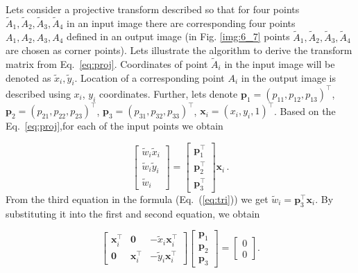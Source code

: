 \documentclass[12pt]{article}
\def\mvec#1{\mathbf{#1}}
\begin{document}
Lets consider a projective transform described so that for four points $\tilde{A}_{1} ,\tilde{A}_{2} ,\tilde{A}_{3} ,\tilde{A}_{4}$
in an input image there are corresponding four points $A_{1} ,A_{2}, A_{3}, A_{4}$ defined in an output image
(in Fig. \ref{img:6_7} points $\tilde{A}_{1}, \tilde{A}_{2}, \tilde{A}_{3}, \tilde{A}_{4}$ are chosen as corner points).
Lets illustrate the algorithm to derive the transform matrix from Eq.~\eqref{eq:proj}.
Coordinates of point $\tilde{A}_{i}$ in the input image will be denoted as $\tilde{x}_{i}, \tilde{y}_{i}$.
Location of a corresponding point $A_i$ in the output image is described using $x_i$, $y_i$ coordinates.
Further, lets denote $\mathbf{p}_1 = (p_{11}, p_{12}, p_{13})^\top$, $\mathbf{p}_2 = (p_{21}, p_{22}, p_{23})^\top$, $\mathbf{p}_3 = (p_{31}, p_{32}, p_{33})^\top$, $\mathbf{x}_i = (x_i, y_i, 1)^\top$.
Based on the Eq.~\eqref{eq:proj},for each of the input points we obtain

\begin{equation}
    \label{eq:tri}
\left[\begin{array}{c} {\tilde{w}_{i} \tilde{x}_{i} } \\ {\tilde{w}_{i} \tilde{y}_{i} } \\ {\tilde{w}_{i} } \end{array}\right]=\left[\begin{array}{c} {\mvec{p}_{1}^\top} \\ {\mvec{p}_{2}^\top} \\ {\mvec{p}_{3}^\top} \end{array}\right]\mvec{x}_{i} \, .
\end{equation}
From the third equation in the formula (Eq.~(\ref{eq:tri})) we get $\tilde{w}_{i} = \mathbf{p}_3^\top \mathbf{x}_{i}$.
By substituting it into the first and second equation, we obtain

\begin{equation}
    \label{eq:our_proj}
    \left[
    \begin{array}{ccc}
    \mathbf{x}_i^\top & \mathbf{0} & -\tilde{x}_i \mathbf{x}_i^\top \\
    \mathbf{0} & \mathbf{x}_i^\top & -\tilde{y}_i \mathbf{x}_i^\top
    \end{array}
    \right]
    \left[
    \begin{array}{c}
    \mathbf{p}_1 \\
    \mathbf{p}_2 \\
    \mathbf{p}_3
    \end{array}
    \right]
    =
    \left[
    \begin{array}{c}
    0 \\ 0
    \end{array}
    \right].
\end{equation}
\end{document}
